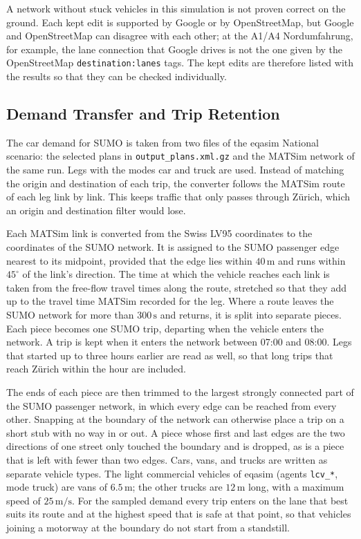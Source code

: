 A network without stuck vehicles in this simulation is not proven
correct on the ground. Each kept edit is supported by Google or by
OpenStreetMap, but Google and OpenStreetMap can disagree with each
other; at the A1/A4 Nordumfahrung, for example, the lane connection
that Google drives is not the one given by the OpenStreetMap
\texttt{destination:lanes} tags. The kept edits are therefore listed
with the results so that they can be checked individually.

\subsection{Demand Transfer and Trip Retention}
\label{subsec:demand-transfer}

The car demand for SUMO is taken from two files of the eqasim
National scenario: the selected plans in \texttt{output\_plans.xml.gz}
and the MATSim network of the same run. Legs with the modes car and truck are used.
Instead of matching the origin and destination of each trip, the
converter follows the MATSim route of each leg link by link. This keeps
traffic that only passes through Zürich, which an origin and
destination filter would lose.

Each MATSim link is converted from the Swiss LV95 coordinates to the
coordinates of the SUMO network. It is assigned to the SUMO passenger
edge nearest to its midpoint, provided that the edge lies within
\(40\,\mathrm{m}\) and runs within \(45^\circ\) of the link's
direction. The time at which the vehicle reaches each link is taken
from the free-flow travel times along the route, stretched so that
they add up to the travel time MATSim recorded for the leg. Where a
route leaves the SUMO network for more than \(300\,\mathrm{s}\) and
returns, it is split into separate pieces. Each piece becomes one SUMO
trip, departing when the vehicle enters the network. A trip is kept
when it enters the network between 07:00 and 08:00. Legs that started
up to three hours earlier are read as well, so that long trips that
reach Zürich within the hour are included.

The ends of each piece are then trimmed to the largest strongly
connected part of the SUMO passenger network, in which every edge can
be reached from every other. Snapping at the boundary of the network
can otherwise place a trip on a short stub with no way in or out. A
piece whose first and last edges are the two directions of one street
only touched the boundary and is dropped, as is a piece that is left
with fewer than two edges. Cars, vans, and trucks are written as
separate vehicle types. The light commercial vehicles of eqasim
(agents \texttt{lcv\_*}, mode truck) are vans of \(6.5\,\mathrm{m}\);
the other trucks are \(12\,\mathrm{m}\) long, with a maximum speed of
\(25\,\mathrm{m/s}\). For the sampled demand every trip enters on
the lane that best suits its route and at the highest speed that is
safe at that point, so that vehicles joining a motorway at the boundary
do not start from a standstill.

